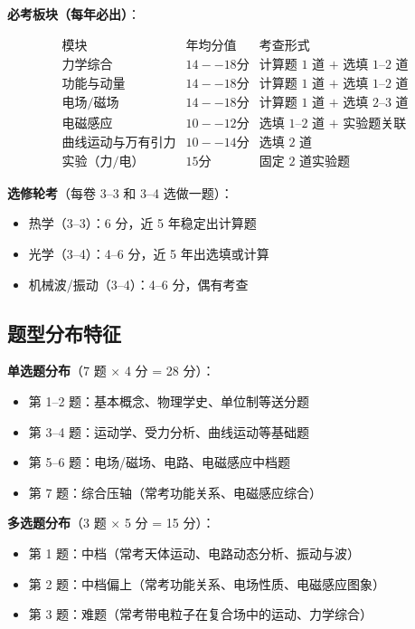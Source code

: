 \textbf{必考板块（每年必出）}：

\[
\begin{array}{c|c|c}
\text{模块} & \text{年均分值} & \text{考查形式} \\ \hline
\text{力学综合} & 14--18 分 & \text{计算题 1 道 + 选填 1--2 道} \\
\text{功能与动量} & 14--18 分 & \text{计算题 1 道 + 选填 1--2 道} \\
\text{电场/磁场} & 14--18 分 & \text{计算题 1 道 + 选填 2--3 道} \\
\text{电磁感应} & 10--12 分 & \text{选填 1--2 道 + 实验题关联} \\
\text{曲线运动与万有引力} & 10--14 分 & \text{选填 2 道} \\
\text{实验（力/电）} & 15 分 & \text{固定 2 道实验题}
\end{array}
\]

\textbf{选修轮考}（每卷 3--3 和 3--4 选做一题）：
\begin{itemize}
  \item 热学（3--3）：6 分，近 5 年稳定出计算题
  \item 光学（3--4）：4--6 分，近 5 年出选填或计算
  \item 机械波/振动（3--4）：4--6 分，偶有考查
\end{itemize}

\subsection{题型分布特征}

\textbf{单选题分布}（7 题 $\times$ 4 分 = 28 分）：
\begin{itemize}
  \item 第 1--2 题：基本概念、物理学史、单位制等送分题
  \item 第 3--4 题：运动学、受力分析、曲线运动等基础题
  \item 第 5--6 题：电场/磁场、电路、电磁感应中档题
  \item 第 7 题：综合压轴（常考功能关系、电磁感应综合）
\end{itemize}

\textbf{多选题分布}（3 题 $\times$ 5 分 = 15 分）：
\begin{itemize}
  \item 第 1 题：中档（常考天体运动、电路动态分析、振动与波）
  \item 第 2 题：中档偏上（常考功能关系、电场性质、电磁感应图象）
  \item 第 3 题：难题（常考带电粒子在复合场中的运动、力学综合）
\end{itemize}

